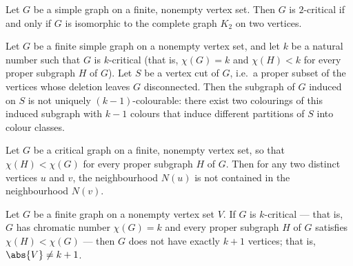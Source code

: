 \begin{theorem}
\label{SimpleGraph.isKCritical_two_iff}
\leanok
{}
Let $G$ be a simple graph on a finite, nonempty vertex set. Then $G$ is $2$-critical if
and only if $G$ is isomorphic to the complete graph $K_2$ on two vertices.
\end{theorem}

\begin{theorem}
\label{SimpleGraph.IsKCritical.not_uniquelyColorable_of_isVertexCut}
\leanok
{}
Let $G$ be a finite simple graph on a nonempty vertex set, and let $k$ be a natural
number such that $G$ is $k$-critical (that is, $\chi(G) = k$ and $\chi(H) < k$ for every
proper subgraph $H$ of $G$). Let $S$ be a vertex cut of $G$, i.e.\ a proper subset of
the vertices whose deletion leaves $G$ disconnected. Then the subgraph of $G$ induced on
$S$ is not uniquely $(k-1)$-colourable: there exist two colourings of this induced
subgraph with $k-1$ colours that induce different partitions of $S$ into colour classes.
\end{theorem}

\begin{theorem}
\label{SimpleGraph.IsCritical.neighborSet_not_subset}
\leanok
{}
Let $G$ be a critical graph on a finite, nonempty vertex set, so that $\chi(H) <
\chi(G)$ for every proper subgraph $H$ of $G$. Then for any two distinct vertices $u$
and $v$, the neighbourhood $N(u)$ is not contained in the neighbourhood $N(v)$.
\end{theorem}

\begin{theorem}
\label{SimpleGraph.no_isKCritical_card_eq_succ}
\leanok
{}
Let $G$ be a finite graph on a nonempty vertex set $V$. If $G$ is $k$-critical — that
is, $G$ has chromatic number $\chi(G) = k$ and every proper subgraph $H$ of $G$
satisfies $\chi(H) < \chi(G)$ — then $G$ does not have exactly $k+1$ vertices; that is,
$\abs{V} \neq k+1$.
\end{theorem}

